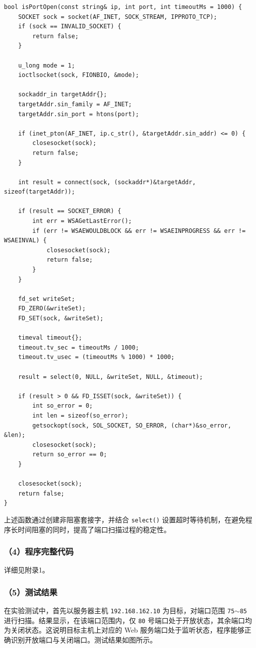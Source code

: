 \documentclass[12pt]{ctexart}
\begin{document}
\begin{verbatim}
bool isPortOpen(const string& ip, int port, int timeoutMs = 1000) {
    SOCKET sock = socket(AF_INET, SOCK_STREAM, IPPROTO_TCP);
    if (sock == INVALID_SOCKET) {
        return false;
    }

    u_long mode = 1;
    ioctlsocket(sock, FIONBIO, &mode);

    sockaddr_in targetAddr{};
    targetAddr.sin_family = AF_INET;
    targetAddr.sin_port = htons(port);

    if (inet_pton(AF_INET, ip.c_str(), &targetAddr.sin_addr) <= 0) {
        closesocket(sock);
        return false;
    }

    int result = connect(sock, (sockaddr*)&targetAddr, sizeof(targetAddr));

    if (result == SOCKET_ERROR) {
        int err = WSAGetLastError();
        if (err != WSAEWOULDBLOCK && err != WSAEINPROGRESS && err != WSAEINVAL) {
            closesocket(sock);
            return false;
        }
    }

    fd_set writeSet;
    FD_ZERO(&writeSet);
    FD_SET(sock, &writeSet);

    timeval timeout{};
    timeout.tv_sec = timeoutMs / 1000;
    timeout.tv_usec = (timeoutMs % 1000) * 1000;

    result = select(0, NULL, &writeSet, NULL, &timeout);

    if (result > 0 && FD_ISSET(sock, &writeSet)) {
        int so_error = 0;
        int len = sizeof(so_error);
        getsockopt(sock, SOL_SOCKET, SO_ERROR, (char*)&so_error, &len);
        closesocket(sock);
        return so_error == 0;
    }

    closesocket(sock);
    return false;
}
\end{verbatim}

上述函数通过创建非阻塞套接字，并结合 \texttt{select()} 设置超时等待机制，在避免程序长时间阻塞的同时，提高了端口扫描过程的稳定性。

\subsubsection*{（4）程序完整代码}

详细见附录1。

\subsubsection*{（5）测试结果}

在实验测试中，首先以服务器主机 \texttt{192.168.162.10} 为目标，对端口范围 \texttt{75$\sim$85} 进行扫描。结果显示，在该端口范围内，仅 \texttt{80} 号端口处于开放状态，其余端口均为关闭状态。这说明目标主机上对应的 Web 服务端口处于监听状态，程序能够正确识别开放端口与关闭端口。测试结果如图所示。
\end{document}
